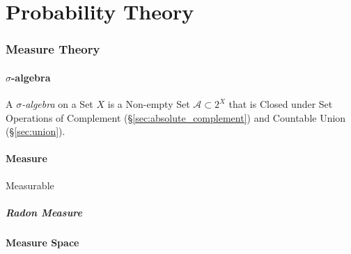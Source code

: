 \part{Probability Theory}\label{part:probability_theory}

\section{Measure Theory}\label{sec:measure_theory}

\subsection{$\sigma$-algebra}\label{sec:sigma_algebra}

A \emph{$\sigma$-algebra} on a Set $X$ is a Non-empty Set $\mathcal{A}
\subset 2^X$ that is Closed under Set Operations of Complement
(\S\ref{sec:absolute_complement}) and Countable Union
(\S\ref{sec:union}).



\subsection{Measure}\label{sec:measure}

Measurable



\subsubsection{Radon Measure}\label{sec:radon_measure}



\subsection{Measure Space}\label{sec:measure_space}


